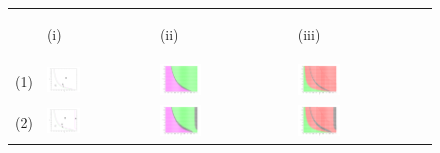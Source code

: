 \documentclass[12pt]{UOthesis}
\theoremstyle{remarkstyle}
\begin{document}
\begin{figure}[h!]
	\centering
	\begin{tabular}{m{0.07cm} m{4.5cm}  m{4.5cm}  m{4.5cm}}
		& \begin{center}
			(i)
		\end{center} & \begin{center}
		(ii)
		\end{center} & \begin{center}
		(iii)
		\end{center}\\
		(1) & \includegraphics[width=0.33\textwidth]{HLOOwlSimpSSMutualInvasion1.png} & \includegraphics[width=0.33\textwidth]{HLOOwlSimpSSSteadyState1.png} & \includegraphics[width=0.33\textwidth]{HLOOwlSimpSSEigenvalues1.png}\\
		
		(2) & \includegraphics[width=0.33\textwidth]{HLOOwlSimpSSMutualInvasion2.png} & \includegraphics[width=0.33\textwidth]{HLOOwlSimpSSSteadyState2.png} & \includegraphics[width=0.33\textwidth]{HLOOwlSimpSSEigenvalues2.png}\\
		

\end{tabular}
\end{figure}
\end{document}
